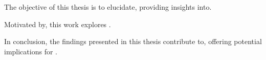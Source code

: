 

The objective of this thesis is to elucidate, providing insights into.  

Motivated by, this work explores .  

In conclusion, the findings presented in this thesis contribute to, offering potential implications for .